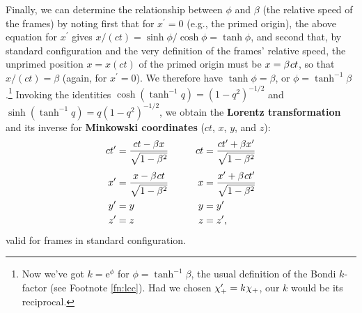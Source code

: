 \documentclass[12pt]{article}
\begin{document}
Finally, we can determine the relationship between $\phi$ and $\beta$ (the relative speed of the frames) by noting first that for $x^{\prime} = 0$ (e.g., the primed origin), the above equation for $x^{\prime}$ gives ${x / (ct) = \sinh \phi / \cosh \phi = \tanh \phi}$, and second that, by standard configuration and the very definition of the frames' relative speed, the unprimed position $x = x(ct)$ of the primed origin must be ${x = \beta \mkern1mu ct}$, so that $x / (ct) = \beta$ (again, for $x^{\prime} = 0$). We therefore have $\tanh \phi = \beta$, or $\phi = \tanh^{-1}{\beta}$.\footnote{\label{fn:bkf}Now we've got $k = \mathrm{e}^{\phi}$ for $\phi = \tanh^{-1}\beta$, the usual definition of the Bondi $k$-factor (see Footnote \ref{fn:lcc}). Had we chosen ${\chi_+^{\prime} = k \mkern.5mu \chi_+}$, our $k$ would be its reciprocal.} Invoking the identities ${\cosh (\tanh^{-1}{q}) = (1 - q^2)^{-1/2}}$ and ${\sinh (\tanh^{-1}{q}) = q(1 - q^2)^{-1/2}}$, we obtain the \textbf{Lorentz transformation} and its inverse for \textbf{Minkowski coordinates} ($ct$, $x$, $y$, and $z$):
\begin{equation}\label{eq:lt}
\begin{aligned}
ct^{\prime} &= \dfrac{ct - \beta x}{\sqrt{1- \beta ^2}}& ct &= \dfrac{ct^\prime + \beta x^\prime}{\sqrt{1- \beta ^2}} \\[3pt]
x^{\prime} &= \dfrac{x - \beta \mkern1mu c t}{\sqrt{1- \beta ^2}}& \qquad x &= \dfrac{x^\prime + \beta \mkern1mu c t^\prime}{\sqrt{1- \beta ^2}}\\
y^{\prime} &= y& y&= y^\prime \\
z^{\prime} &= z& z&= z^\prime,
\end{aligned}
\end{equation}
valid for frames in standard configuration.
\end{document}
